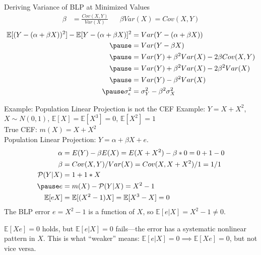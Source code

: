 \documentclass[aspectratio=169, handout, t]{beamer}
\numberwithin{equation}{section}
\begin{document}
\begin{frame}{Deriving Variance of BLP at Minimized Values}
\begin{align*}
\beta &=\frac{Cov(X,Y)}{Var(X)}&&  \beta Var(X)=Cov(X,Y)
\end{align*}  \pause
\begin{align*}
\mathbb{E}[(Y-(\alpha+\beta X))^2]-\mathbb{E}[Y-(\alpha+\beta X)]^2 &=Var(Y-(\alpha+\beta X))\\\pause
&=Var(Y-\beta X)\\\pause
&=Var(Y)+\beta^2Var(X)-2\beta Cov(X,Y)\\\pause
 &=Var(Y)+\beta^2Var(X)-2\beta^2 Var(X)\\\pause
  &=Var(Y)-\beta^2 Var(X)\\\pause
  \sigma^2_\epsilon  &=\sigma^2_Y-\beta^2 \sigma^2_X\\
\end{align*}
\end{frame}



\begin{frame}{Example: Population Linear Projection is not the CEF}
Example: $Y=X+X^2$, $X\sim N(0,1)$, $\mathbb{E}[X]=\mathbb{E}[X^3]=0$, $\mathbb{E}[X^2]=1$\\
True CEF: $m(X)=X+X^2$\\
 Population Linear Projection: $Y=\alpha+\beta X+e$.
\begin{align*}
\alpha&=E(Y)-\beta E(X)=E(X+X^2)-\beta*0=0+1-0\\
\beta&=Cov(X,Y)/Var(X)=Cov(X,X+X^2)/1=1/1\\
\mathcal{P}(Y|X)&=1+1*X\\\pause
e&=m(X)-\mathcal{P}(Y|X)=X^2-1\\
\mathbb{E}[eX]&=\mathbb{E}[(X^2-1)X]=\mathbb{E}[X^3-X]=0
\end{align*}
\pause
The BLP error $e=X^2-1$ is a function of $X$, so $\mathbb{E}[e|X]=X^2-1\neq 0$.

\smallskip
$\mathbb{E}[Xe]=0$ holds, but $\mathbb{E}[e|X]=0$ fails---the error has a systematic nonlinear pattern in $X$.  This is what ``weaker'' means: $\mathbb{E}[e|X]=0 \implies \mathbb{E}[Xe]=0$, but not vice versa.
\end{frame}
\end{document}
